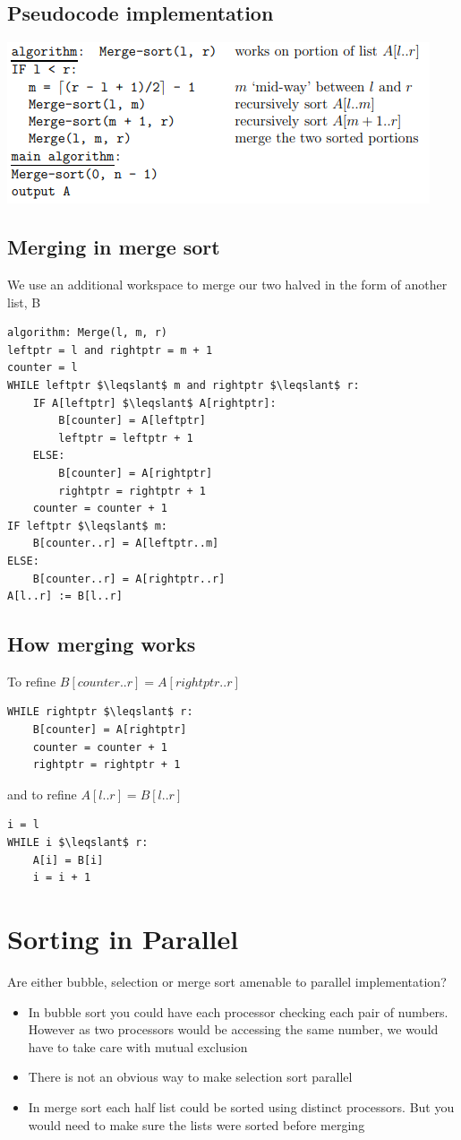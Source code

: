 \documentclass{article}[18pt]
\begin{document}
\subsection{Pseudocode implementation}
\begin{center}
	\includegraphics[scale=0.7]{merge1}
\end{center}
\newpage
\subsection{Merging in merge sort}
We use an additional workspace to merge our two halved in the form of another list, B
\begin{lstlisting}[tabsize=4,mathescape]
algorithm: Merge(l, m, r)
leftptr = l and rightptr = m + 1
counter = l
WHILE leftptr $\leqslant$ m and rightptr $\leqslant$ r:
	IF A[leftptr] $\leqslant$ A[rightptr]:
		B[counter] = A[leftptr]
		leftptr = leftptr + 1
	ELSE:
		B[counter] = A[rightptr]
		rightptr = rightptr + 1
	counter = counter + 1
IF leftptr $\leqslant$ m:
	B[counter..r] = A[leftptr..m]
ELSE:
	B[counter..r] = A[rightptr..r]
A[l..r] := B[l..r]
\end{lstlisting}
\subsection{How merging works}
To refine $B[counter..r] = A[rightptr..r]$
\begin{lstlisting}[tabsize=4,mathescape]
WHILE rightptr $\leqslant$ r:
	B[counter] = A[rightptr]
	counter = counter + 1
	rightptr = rightptr + 1
\end{lstlisting}
and to refine $A[l..r] = B[l..r]$
\begin{lstlisting}[tabsize=4,mathescape]
i = l
WHILE i $\leqslant$ r:
	A[i] = B[i]
	i = i + 1
\end{lstlisting}
\section{Sorting in Parallel}
Are either bubble, selection or merge sort amenable to parallel implementation?
\begin{itemize}
	\item In bubble sort you could have each processor checking each pair of numbers. However as two processors would be accessing the same number, we would have to take care with mutual exclusion
	\item There is not an obvious way to make selection sort parallel
	\item In merge sort each half list could be sorted using distinct processors. But you would need to make sure the lists were sorted before merging
\end{itemize}
\end{document}
